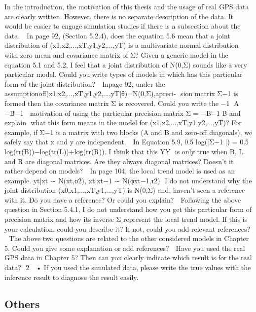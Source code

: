 \documentclass[a4paper,18pt]{extarticle}
\begin{document}
In the introduction, the motivation of this thesis and the usage of real GPS data are clearly written. However, there is no separate description of the data. It would be easier to engage simulation studies if there is a subsection about the data.  
In page 92, (Section 5.2.4), does the equation 5.6 mean that a joint distribution of (x1,x2,...,xT,y1,y2,...,yT) is a multivariate normal distribution with zero mean and covariance matrix of Σ? Given a generic model in the equation 5.1 and 5.2, I feel that a joint distribution of N(0,Σ) sounds like a very particular model. Could you write types of models in which has this particular form of the joint distribution?  
Inpage 92, under the assumptionoff(x1,x2,...,xT,y1,y2,...,yT|θ)=N(0,Σ),apreci-  sion matrix Σ−1 is formed then the covariance matrix Σ is recovered. Could you write the −1 􏰀A −B−1􏰁  motivation of using the particular precision matrix Σ = −B−1 B and explain  what this form means in the model for (x1,x2,...,xT,y1,y2,...,yT)? For example, if Σ−1 is a matrix with two blocks (A and B and zero-off diagonals), we safely say that x and y are independent.  
In Equation 5.9, 0.5 log(|Σ−1 |) = 0.5 log(tr(B))−log(tr(L))+log(tr(R)). I think that this YY  is only true when B, L and R are diagonal matrices. Are they always diagonal matrices? Doesn’t it rather depend on models?  
In page 104, the local trend model is used as an example. yt|xt ∼ N(xt,σ2), xt|xt−1 ∼ N(φxt−1,τ2)  I do not understand why the joint distribution (x0,x1,...,xT,y1,...,yT) is N(0,Σ) and, haven’t seen a reference with it. Do you have a reference? Or could you explain?  
Following the above question in Section 5.4.1, I do not understand how you get this particular form of precision matrix and how its inverse Σ represent the local trend model. If this is your calculation, could you describe it? If not, could you add relevant references?  
The above two questions are related to the other considered models in Chapter 5. Could you give some explanation or add references?  
Have you used the real GPS data in Chapter 5? Then can you clearly indicate which result is for the real data?  2  
• If you used the simulated data, please write the true values with the inference result to diagnose the result easily. 



\subsection{Others}
\end{document}
